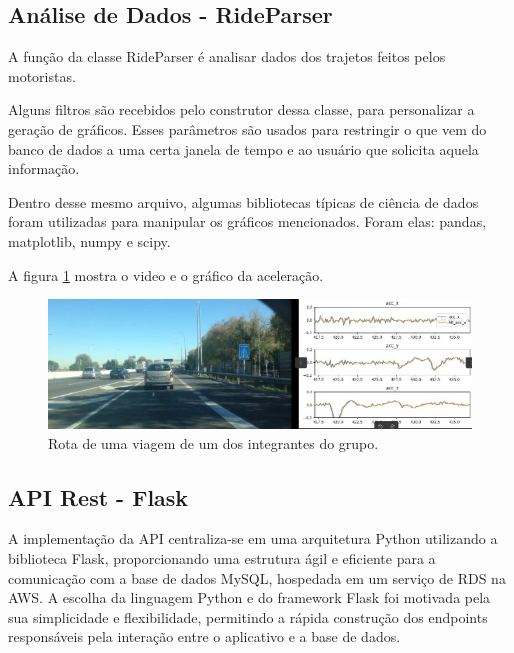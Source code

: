    

    \subsection{Análise de Dados - RideParser}\label{rideparser}

    A função da classe RideParser é analisar dados dos trajetos feitos pelos motoristas. 
    
    Alguns filtros são recebidos pelo construtor dessa classe, para personalizar a geração de gráficos. Esses parâmetros são usados para restringir o que vem do banco de dados a uma certa janela de tempo e ao usuário que solicita aquela informação.
    
    Dentro desse mesmo arquivo, algumas bibliotecas típicas de ciência de dados foram utilizadas para manipular os gráficos mencionados. Foram elas: pandas, matplotlib, numpy e scipy.
    
    A figura \ref{fig:rota1integrante} mostra o video e o gráfico da aceleração.
    
    \begin{figure}[hp]
        \centering
        
        \includegraphics[scale=0.6]{figures/rota_integrante.jpg}
        
        \caption{Rota de uma viagem de um dos integrantes do grupo.}
        \label{fig:rota1integrante}
    \end{figure}

    \subsection{API Rest - Flask}
    A implementação da API centraliza-se em uma arquitetura Python utilizando a biblioteca Flask, proporcionando uma estrutura ágil e eficiente para a comunicação com a base de dados MySQL, hospedada em um serviço de RDS na AWS. A escolha da linguagem Python e do framework Flask foi motivada pela sua simplicidade e flexibilidade, permitindo a rápida construção dos endpoints responsáveis pela interação entre o aplicativo e a base de dados.

